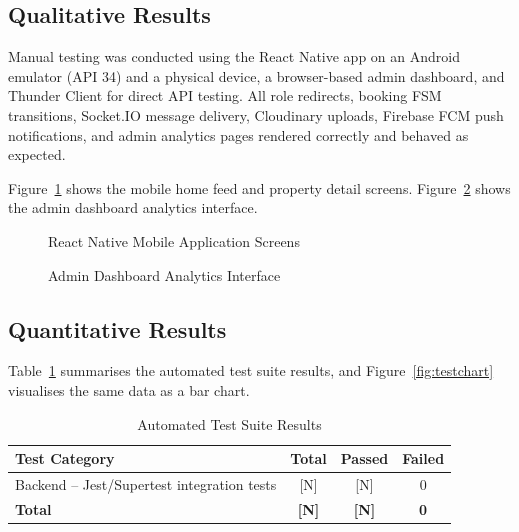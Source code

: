 \documentclass[12pt,a4paper]{report}
\begin{document}
\subsection{Qualitative Results}

Manual testing was conducted using the React Native app on an Android emulator (API 34)
and a physical device, a browser-based admin dashboard, and Thunder Client for direct API
testing. All role redirects, booking FSM transitions, Socket.IO message delivery,
Cloudinary uploads, Firebase FCM push notifications, and admin analytics pages rendered
correctly and behaved as expected.

Figure~\ref{fig:screen1} shows the mobile home feed and property detail screens.
Figure~\ref{fig:screen2} shows the admin dashboard analytics interface.

\begin{figure}[H]
\centering
\caption{React Native Mobile Application Screens}
\label{fig:screen1}
\end{figure}

\begin{figure}[H]
\centering
\caption{Admin Dashboard Analytics Interface}
\label{fig:screen2}
\end{figure}

\subsection{Quantitative Results}

Table~\ref{tab:tests} summarises the automated test suite results, and
Figure~\ref{fig:testchart} visualises the same data as a bar chart.

\begin{table}[H]
\caption{Automated Test Suite Results}
\label{tab:tests}
\centering
\small
{}
\begin{tabularx}{\textwidth}{|X|c|c|c|}
\hline
\textbf{Test Category} & \textbf{Total} & \textbf{Passed} & \textbf{Failed} \\
\hline
Backend -- Jest/Supertest integration tests & [N] & [N] & 0 \\
\hline
\textbf{Total} & \textbf{[N]} & \textbf{[N]} & \textbf{0} \\
\hline
\end{tabularx}
\end{table}
\end{document}
